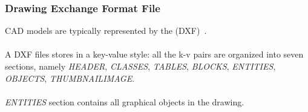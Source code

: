 \begin{frame}
\frametitle{Drawing Exchange Format File}

CAD models are typically represented by the (DXF)~\cite{autoc77:online}.\\~\\

A DXF files stores in a key-value style: all the k-v pairs are organized into seven sections, namely \emph{HEADER}, \emph{CLASSES}, \emph{TABLES}, \emph{BLOCKS}, \emph{ENTITIES}, \emph{OBJECTS}, \emph{THUMBNAILIMAGE}.\\~\\

\emph{ENTITIES} section contains all graphical objects in the drawing.

\end{frame}


